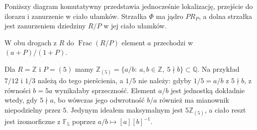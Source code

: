 Poniższy diagram komutatywny przedstawia jednocześnie
lokalizację, przejście do ilorazu i zanurzenie w ciało
ułamków. Strzałka $\Phi$ ma jądro $PR_P$, a dolna
strzałka jest zanurzeniem dziedziny $R/P$ w jej ciało
ułamków.
\begin{center}
\end{center}
W obu drogach z $R$ do $\operatorname{Frac}(R/P)$
element $a$ przechodzi w $(a+P)/(1+P)$.

\begin{przyklad}
\label{aa:prz:z-local-five}
Dla $R=\mathbb Z$ i $P=(5)$ mamy
$\mathbb Z_{(5)}=\{a/b:\ a,b\in\mathbb Z,\ 5\nmid b\}\subset\mathbb Q$.
Na przykład $7/12$ i $1/3$ należą do tego pierścienia,
a $1/5$ nie należy: gdyby $1/5=a/b$ z $5\nmid b$,
z równości $b=5a$ wynikałaby sprzeczność.
Element $a/b$ jest jednostką dokładnie wtedy,
gdy $5\nmid a$, bo wówczas jego odwrotność $b/a$
również ma mianownik niepodzielny przez $5$.
Jedynym ideałem maksymalnym jest
$5\mathbb Z_{(5)}$, a ciało reszt jest izomorficzne
z $\mathbb F_5$ poprzez $a/b\mapsto[a][b]^{-1}$.
\end{przyklad}

